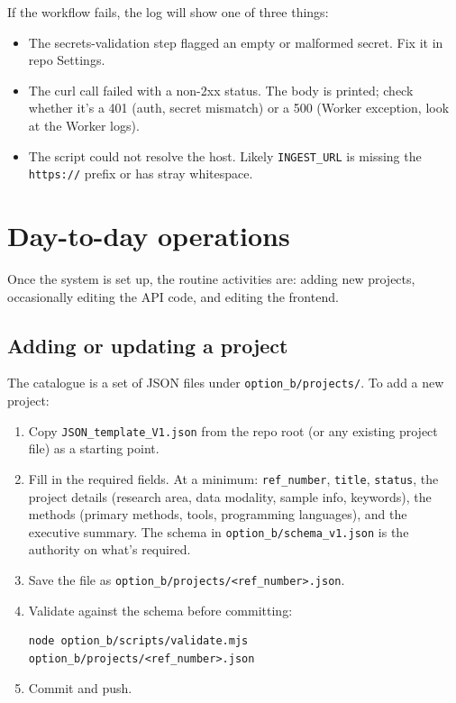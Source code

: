 \documentclass[11pt,a4paper]{article}
\begin{document}
If the workflow fails, the log will show one of three things:

\begin{itemize}[leftmargin=1.5em,itemsep=2pt]
  \item The secrets-validation step flagged an empty or malformed secret. Fix it in repo Settings.
  \item The curl call failed with a non-2xx status. The body is printed; check whether it's a 401 (auth, secret mismatch) or a 500 (Worker exception, look at the Worker logs).
  \item The script could not resolve the host. Likely \texttt{INGEST\_URL} is missing the \texttt{https://} prefix or has stray whitespace.
\end{itemize}

\section{Day-to-day operations}

Once the system is set up, the routine activities are: adding new projects, occasionally editing the API code, and editing the frontend.

\subsection{Adding or updating a project}

The catalogue is a set of JSON files under \texttt{option\_b/projects/}. To add a new project:

\begin{enumerate}[leftmargin=1.5em,itemsep=2pt]
  \item Copy \texttt{JSON\_template\_V1.json} from the repo root (or any existing project file) as a starting point.
  \item Fill in the required fields. At a minimum: \texttt{ref\_number}, \texttt{title}, \texttt{status}, the project details (research area, data modality, sample info, keywords), the methods (primary methods, tools, programming languages), and the executive summary. The schema in \texttt{option\_b/schema\_v1.json} is the authority on what's required.
  \item Save the file as \texttt{option\_b/projects/<ref\_number>.json}.
  \item Validate against the schema before committing:
\begin{lstlisting}[style=shell]
node option_b/scripts/validate.mjs option_b/projects/<ref_number>.json
\end{lstlisting}
  \item Commit and push.
\end{enumerate}
\end{document}
